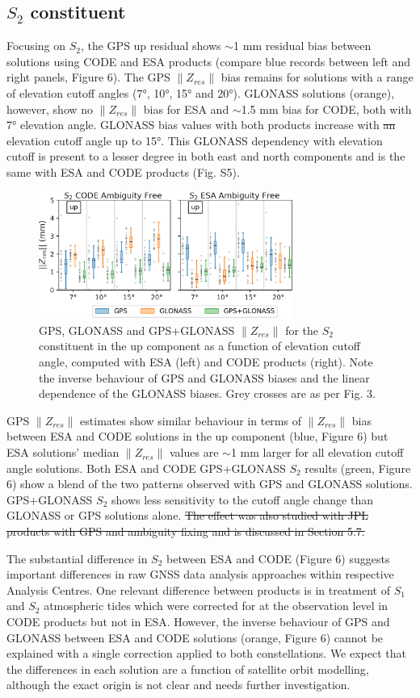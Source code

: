 \documentclass[se, manuscript]{copernicus}
\providecommand{\DIFdel}[1]{{\protect\color{red}\sout{#1}}}                      %
\providecommand{\DIFdelbegin}{} %
\providecommand{\DIFdelend}{} %
\begin{document}
\subsection{$S_2$ constituent}
Focusing on $S_2$, the GPS up residual shows $\sim$1 mm residual bias between solutions using CODE and ESA products (compare blue records between left and right panels, Figure 6). The GPS $\|Z_{res}\|$ bias remains for solutions with a range of elevation cutoff angles (7°, 10°, 15° and 20°). GLONASS solutions (orange), however, show no $\|Z_{res}\|$ bias for ESA and $\sim$1.5 mm bias for CODE, both with 7° elevation angle. GLONASS bias values with both products increase with \DIFdelbegin \DIFdel{an }\DIFdelend elevation cutoff angle up to 15°. This GLONASS dependency with elevation cutoff is present to a lesser degree in both east and north components and is the same with ESA and CODE products (Fig. S5).

\begin{figure}[t]
\includegraphics[width=8.3cm]{fig06.png}
\caption{GPS, GLONASS and GPS+GLONASS $\|Z_{res}\|$ for the $S_2$ constituent in the up component as a function of elevation cutoff angle, computed with ESA (left) and CODE products (right). Note the inverse behaviour of GPS and GLONASS biases and the linear dependence of the GLONASS biases. Grey crosses are as per Fig. 3.}
\end{figure}

GPS $\|Z_{res}\|$ estimates show similar behaviour in terms of $\|Z_{res}\|$ bias between ESA and CODE solutions in the up component (blue, Figure 6) but ESA solutions' median $\|Z_{res}\|$ values are $\sim$1 mm larger for all elevation cutoff angle solutions. Both ESA and CODE GPS+GLONASS $S_2$ results (green, Figure 6) show a blend of the two patterns observed with GPS and GLONASS solutions. GPS+GLONASS $S_2$ shows less sensitivity to the cutoff angle change than GLONASS or GPS solutions alone.
\DIFdelbegin \DIFdel{The effect was also studied with JPL products with GPS and ambiguity fixing and is discussed in Section 5.7.
}\DIFdelend 

The substantial difference in $S_2$ between ESA and CODE (Figure 6) suggests important differences in raw GNSS data analysis approaches within respective Analysis Centres. One relevant difference between products is in treatment of $S_1$ and $S_2$ atmospheric tides which were corrected for at the observation level in CODE products but not in ESA. However, the inverse behaviour of GPS and GLONASS between ESA and CODE solutions (orange, Figure 6) cannot be explained with a single correction applied to both constellations. We expect that the differences in each solution are a function of satellite orbit modelling, although the exact origin is not clear and needs further investigation.
\end{document}
